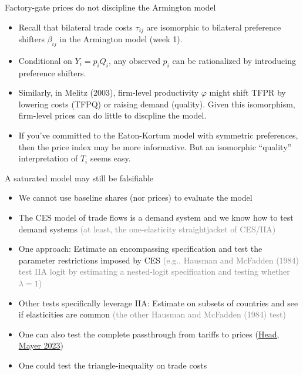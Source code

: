 \documentclass[11pt,notes=hide,aspectratio=169]{beamer}
\begin{document}
\begin{frame}{Factory-gate prices do not discipline the Armington model}
\begin{itemize}
\item
Recall that bilateral trade costs $\tau_{ij}$ are isomorphic to bilateral preference shifters $\beta_{ij}$ in the Armington model (week 1).
\item
Conditional on $Y_i = p_i Q_i$, any observed $p_i$ can be rationalized by introducing preference shifters.
\item
Similarly, in Melitz (2003), firm-level productivity $\varphi$ might shift TFPR by lowering costs (TFPQ) or raising demand (quality).
Given this isomorphism, firm-level prices can do little to discpline the model.
\item
If you've committed to the Eaton-Kortum model with symmetric preferences,
then the price index may be more informative.
But an isomorphic ``quality'' interpretation of $T_i$ seems easy.
\end{itemize}
\end{frame}
\begin{frame}{A saturated model may still be falsifiable}
\begin{itemize}
\item We cannot use baseline shares (nor prices) to evaluate the model
\item The CES model of trade flows is a demand system and we know how to test demand systems
\textcolor{gray}{(at least, the one-elasticity straightjacket of CES/IIA)}
\item One approach: Estimate an encompassing specification and test the parameter restrictions imposed by CES
\textcolor{gray}{(e.g., Hausman and McFadden (1984) test IIA logit by estimating a nested-logit specification and testing whether $\lambda = 1$)}
\item Other tests specifically leverage IIA:
Estimate on subsets of countries and see if elasticities are common
\textcolor{gray}{(the other Hausman and McFadden (1984) test)}
\item One can also test the complete passthrough from tariffs to prices (\href{https://direct.mit.edu/rest/article/doi/10.1162/rest_a_01369/117708/Poor-Substitutes-Counterfactual-Methods-in-IO-and}{Head, Mayer 2023})
\item One could test the triangle-inequality on trade costs
\end{itemize}
\end{frame}
\end{document}
